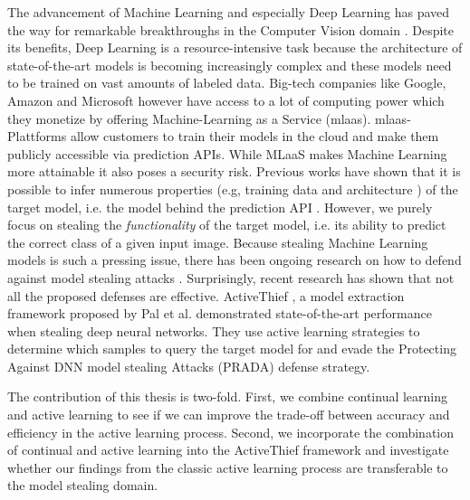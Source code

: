 
\Abstract
The advancement of Machine Learning and especially Deep Learning has paved the way for remarkable breakthroughs in the Computer Vision domain \cite{he2016deep}
\cite{goodfellow2020generative} \cite{lecun1989backpropagation}. Despite its benefits, Deep Learning is a resource-intensive task because the architecture
of state-of-the-art models is becoming increasingly complex and these models need to be trained on vast amounts of labeled data. Big-tech companies like Google,
Amazon and Microsoft however have access to a lot of computing power which they monetize by offering Machine-Learning as a Service (\gls{mlaas}). \gls{mlaas}-
Plattforms allow customers to train their models in the cloud and make them publicly accessible via prediction APIs. While MLaaS makes Machine Learning more
attainable it also poses a security risk. Previous works have shown that it is possible to infer numerous properties (e.g, training data \cite{shokri2017membership}
and architecture \cite{oh2019towards}) of the target model, i.e. the model behind the prediction API \cite{tramer2016stealing} \cite{papernot2017practical}.
However, we purely focus on stealing the \textit{functionality} of the target model, i.e. its ability to predict the correct class of a given input image.
Because stealing Machine Learning models is such a pressing issue, there has been ongoing research on how to defend against model stealing attacks
\cite{orekondy2019prediction} \cite{juuti2019prada}. Surprisingly, recent research has shown that not all the proposed defenses are effective.
ActiveThief \cite{pal2020activethief}, a model extraction framework proposed by Pal et al. demonstrated state-of-the-art performance when stealing deep neural
networks. They use active learning strategies to determine which samples to query the target model for and evade the Protecting Against DNN model stealing Attacks
(PRADA)\cite{juuti2019prada} defense strategy. \par
The contribution of this thesis is two-fold. First, we combine continual learning and active learning to see if we can improve the trade-off between accuracy and 
efficiency in the active learning process. Second, we incorporate the combination of continual and active learning into the ActiveThief framework and investigate
whether our findings from the classic active learning process are transferable to the model stealing domain.
